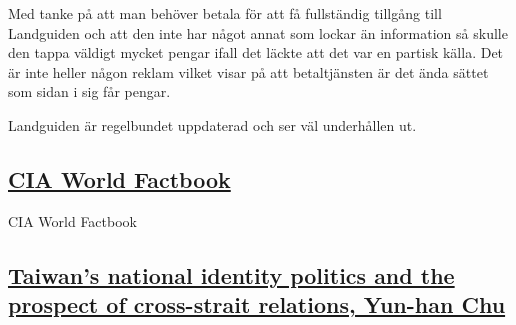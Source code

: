\documentclass[a4paper,10pt]{article}
\begin{document}
Med tanke på att man behöver betala för att få fullständig tillgång till Landguiden och att den inte har något annat som lockar än information så skulle den tappa väldigt mycket pengar ifall det läckte att det var en partisk källa. Det är inte heller någon reklam vilket visar på att betaltjänsten är det ända sättet som sidan i sig får pengar.

Landguiden är regelbundet uppdaterad och ser väl underhållen ut.
\subsection*{\href{https://www.cia.gov/library/publications/the-world-factbook/geos/tw.html}{CIA World Factbook}}
CIA World Factbook

\subsection*{\href{http://isites.harvard.edu/fs/docs/icb.topic199080.files/Readings_for_October_23_/Chu.AS.04.pdf}{Taiwan’s national identity politics and the prospect of cross-strait relations, Yun-han Chu}}

%
%
%
%
%
%
%
%
%
%
%
%
%
\end{document}
